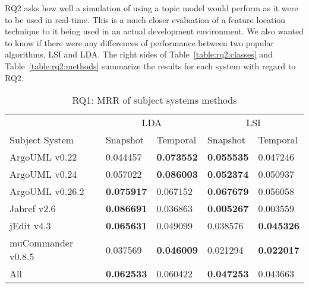 RQ2 asks how well a simulation of using a topic model would perform as
it were to be used in real-time.
This is a much closer evaluation of a feature location technique to it
being used in an actual development environment.
We also wanted to know if there were any differences of performance
between two popular algorithms, LSI and LDA.
The right sides of Table~\ref{table:rq2:classes} and Table~\ref{table:rq2:methods}
summarize the results for each system with regard to RQ2.


\begin{table}[t]
\renewcommand{\arraystretch}{1.3}
\centering
\caption{RQ1: MRR of subject systems methods}
\begin{tabular}{l|ll|ll}
    \toprule
                         & \multicolumn{2}{c|}{LDA}      &  \multicolumn{2}{c}{LSI}  \\
    Subject System       & Snapshot      & Temporal      & Snapshot      & Temporal  \\
    \midrule
ArgoUML v0.22 & 0.044457 & {\bf 0.073552 } & {\bf 0.055535 } & 0.047246  \\
ArgoUML v0.24 & 0.057022 & {\bf 0.086003 } & {\bf 0.052374 } & 0.050937  \\
ArgoUML v0.26.2 & {\bf 0.075917 } & 0.067152 & {\bf 0.067679 } & 0.056058  \\
Jabref v2.6 & {\bf 0.086691 } & 0.036863 & {\bf 0.005267 } & 0.003559  \\
jEdit v4.3 & {\bf 0.065631 } & 0.049099 & 0.038576 & {\bf 0.045326 }  \\
muCommander v0.8.5 & 0.037569 & {\bf 0.046009 } & 0.021294 & {\bf 0.022017 }  \\
    \midrule
All & {\bf 0.062533 } & 0.060422 & {\bf 0.047253 } & 0.043663  \\
    \bottomrule
\end{tabular}
\label{table:rq1:methods}
\end{table}

